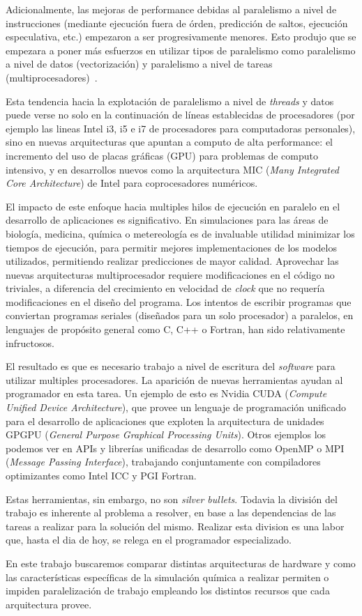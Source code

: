 Adicionalmente, las mejoras de performance debidas al paralelismo 
a nivel de instrucciones (mediante ejecuci\'on fuera de \'orden, 
predicci\'on de saltos, ejecuci\'on especulativa, etc.) empezaron a ser 
progresivamente menores. Esto produjo que se empezara a poner m\'as esfuerzos en
utilizar tipos de paralelismo como paralelismo a nivel de datos (vectorizaci\'on)
y paralelismo a nivel de tareas (multiprocesadores)~\cite{HennessyPatterson}.

Esta tendencia hacia la explotaci\'on de paralelismo a nivel de \textit{threads} y datos 
puede verse no solo en la continuaci\'on de l\'ineas establecidas
de procesadores (por ejemplo las lineas Intel i3, i5 e i7 de procesadores para computadoras
personales), sino en nuevas arquitecturas que apuntan a computo de alta performance: el incremento
del uso de placas gr\'aficas (GPU) para problemas de computo intensivo, y en desarrollos
nuevos como la arquitectura MIC (\textit{Many Integrated Core Architecture}) de
Intel para coprocesadores num\'ericos.

El impacto de este enfoque hacia multiples hilos de ejecuci\'on en paralelo en el
desarrollo de aplicaciones es significativo. En simulaciones para las \'areas de biolog\'ia,
medicina, qu\'imica o metereolog\'ia es de invaluable utilidad minimizar los tiempos
de ejecuci\'on, para permitir mejores implementaciones de los modelos utilizados,
permitiendo realizar predicciones de mayor calidad. Aprovechar las nuevas
arquitecturas multiprocesador requiere modificaciones en el c\'odigo no triviales,
a diferencia del crecimiento en velocidad de \textit{clock} que no requer\'ia modificaciones
en el dise\~no del programa. Los intentos de escribir programas que conviertan
programas seriales (dise\~nados para un solo procesador) a paralelos, en lenguajes
de prop\'osito general como C, C++ o Fortran, han sido relativamente infructosos.

El resultado es que es necesario trabajo a nivel de escritura del \textit{software}
para utilizar multiples procesadores. La aparici\'on de nuevas herramientas ayudan
al programador en esta tarea. Un ejemplo de esto es Nvidia CUDA (\textit{Compute
Unified Device Architecture}), que provee un lenguaje de programaci\'on unificado
para el desarrollo de aplicaciones que exploten la arquitectura de unidades GPGPU
(\textit{General Purpose Graphical Processing Units}). Otros ejemplos los podemos
ver en APIs y librer\'ias unificadas de desarrollo como OpenMP o MPI
(\textit{Message Passing Interface}), trabajando conjuntamente con compiladores
optimizantes como Intel ICC y PGI Fortran.

Estas herramientas, sin embargo, no son \textit{silver bullets}. Todavia la divisi\'on
del trabajo es inherente al problema a resolver, en base a las dependencias de las tareas
a realizar para la soluci\'on del mismo. Realizar esta division es una labor que, hasta
el dia de hoy, se relega en el programador especializado.

En este trabajo buscaremos comparar distintas arquitecturas de hardware y como
las caracter\'isticas espec\'ificas de la simulaci\'on qu\'imica a realizar permiten
o impiden paralelizaci\'on de trabajo empleando los distintos recursos que cada
arquitectura provee.
